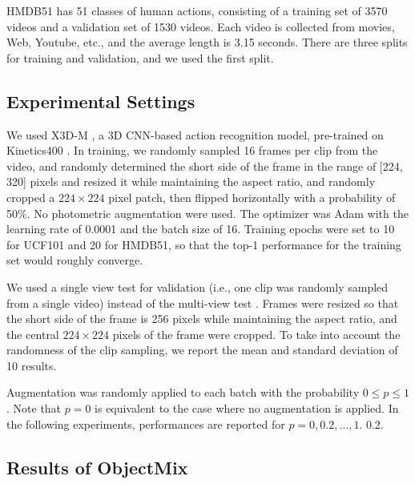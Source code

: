 HMDB51 \cite{wishart2018hmdb}
has 51 classes of human actions,
consisting of a training set of 3570 videos and a validation set of 1530 videos.
Each video is collected from movies, Web, Youtube, etc.,
and the average length is 3.15 seconds.
There are three splits for training and validation, and we used the first split.



\subsection{Experimental Settings}

We used X3D-M \cite{X3D}, a 3D CNN-based action recognition model,
pre-trained on Kinetics400 \cite{DBLP:journals/corr/Kinetics}.
In training, we randomly sampled 16 frames per clip from the video,
and randomly determined the short side of the frame in the range of [224, 320] pixels and
resized it while maintaining the aspect ratio,
and randomly cropped a $224\times224$ pixel patch,
then flipped horizontally with a probability of 50\%.
No photometric augmentation were used.
The optimizer was Adam with the learning rate of 0.0001 and the batch size of 16.
Training epochs were set to 10 for UCF101 and 20 for HMDB51,
so that the top-1 performance for the training set would roughly converge.



We used a single view test for validation (i.e., one clip was randomly sampled from a single video) instead of the multi-view test \cite{Nonlocal}.
Frames were resized so that the short side of the frame is 256 pixels
while maintaining the aspect ratio, and the central $224\times224$ pixels of the frame were cropped.
To take into account the randomness of the clip sampling,
we report the mean and standard deviation of 10 results.

Augmentation was randomly applied to each batch with the probability $0 \le p \le 1$.
Note that $p=0$ is equivalent to the case where no augmentation is applied.
In the following experiments, performances are reported for $p=0, 0.2, \ldots, 1$. 0.2.








\subsection{Results of ObjectMix}


